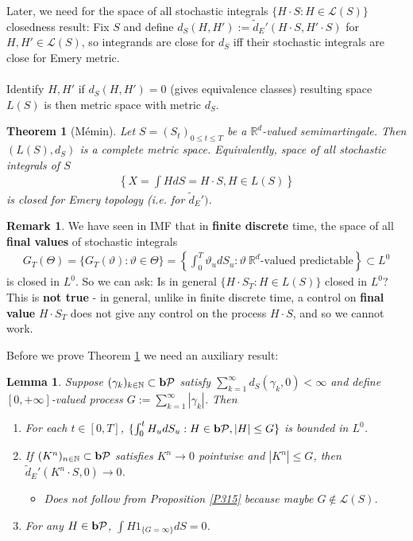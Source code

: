 \documentclass[12pt,a4paper, twoside]{article}
\newtheorem{lem}{Lemma}[section]
\newtheorem{thm}{Theorem}[section]
\theoremstyle{definition}
\newtheorem{rem}{Remark}[section]
\newcommand{\pred}{\textbf{\text{b}}\mathcal{P}}
\begin{document}
Later, we need for the space of all stochastic integrals $\{ H \cdot S : H \in \mathcal{L}(S) \}$ closedness result: Fix $S$ and define $d_S(H,H'):= \widetilde{d}_E'(H \cdot S , H' \cdot S)$ for $H,H' \in \mathcal{L}(S)$, so integrands are close for $d_S$ iff their stochastic integrals are close for Emery metric. 
\\\\
Identify $H, H'$ if $d_S(H,H')=0$ (gives equivalence classes) resulting space $L(S)$ is then metric space with metric $d_S$. 
\newpage
\begin{thm}[Mémin] \label{T317} Let $S=(S_t)_{0 \leq t \leq T}$ be a $\mathbb{R}^d$-valued semimartingale. Then $(L(S), d_S)$ is a complete metric space. Equivalently, space of all stochastic integrals of $S$ 
\begin{align*}
\left\{ X= \int H dS = H \cdot S, H \in L(S) \right\}
\end{align*}
is closed for Emery topology (i.e. for $\widetilde{d}_E')$. 
\end{thm}
\begin{rem} We have seen in IMF that in \textbf{finite discrete} time, the space of all \textbf{final values} of stochastic integrals 
\begin{align*}
G_T( \Theta) = \{ G_T( \vartheta) : \vartheta \in \Theta\} = \left\{ \int_0^T \vartheta_u dS_u : \vartheta \ \mathbb{R}^d\text{-valued predictable} \right\} \subset L^0
\end{align*}
is closed in $L^0$. So we can ask: Is in general $\{ H \cdot S_T : H \in L(S) \}$ closed in $L^0$? 
\\
This is \textbf{not true} - in general, unlike in finite discrete time, a control on \textbf{final value} $H \cdot S_T$ does not give any control on the process $H \cdot S$, and so we cannot work. 
\end{rem}
Before we prove Theorem \ref{T317} we need an auxiliary result:
\begin{lem}\label{L316} Suppose $( \gamma_k)_{k \in \mathbb{N}} \subset \pred$ satisfy $\sum_{k=1}^\infty d_S( \gamma_k,0) < \infty$ and define $[0,+ \infty]$-valued process $G:= \sum_{k=1}^\infty | \gamma_k|$. Then 
\begin{enumerate}
\item For each $t \in [0,T]$, $ \{ \int_0^t H_u dS_u : H \in \pred , |H| \leq G \}$ is bounded in $L^0$. 
\item If $(K^n)_{n \in \mathbb{N}} \subset \pred$ satisfies $K^n \to 0$ pointwise and $|K^n| \leq G$, then \\ $\widetilde{d}_E'( K^n \cdot S,0) \to 0$. 
\begin{itemize}
\item Does not follow from Proposition \ref{P315} because maybe $G \notin \mathcal{L}(S)$.
\end{itemize}
\item For any $H \in \pred$, $ \int H 1_{\{ G = \infty\}} dS =0$. 
\end{enumerate}
\end{lem}
\end{document}
